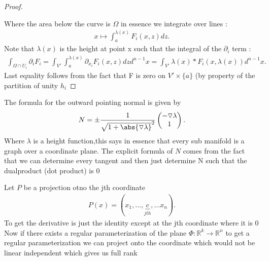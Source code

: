 \begin{proof}
\begin{figure}[H]
\begin{center}
 \end{center} 
 \end{figure}
 Where the area below the curve is $\Omega $ in essence we integrate over lines : 
 \begin{align*}
  x \mapsto \int_a^{\lambda(x)}  F_i(x,z) dz
 .\end{align*}
 Note that $\lambda(x)$ is the height at point x such that the integral of the $\partial_i$ term :
 \begin{align*}
   \int_{\Omega  \cap U_i} \partial_i F_i = \int_{V'} \int_a^{\lambda(x)}  \partial_{x_i} F_i(x,z) dz d^{n-1} x  = \int_{V'} \lambda(x)*F_i(x,\lambda(x)) d^{n-1}x
 .\end{align*}
 Last equality follows from the fact that F is zero on $V' \times  \{a\}  $ (by property of the partition of unity $h_i$ 
\end{proof}
\begin{definition}
  The formula for the outward pointing normal is given by 
  \begin{align*}
    N =  \pm \frac{1}{\sqrt{1+\abs{\triangledown \lambda}}^2 }\begin{pmatrix} -\triangledown \lambda  \\ 1 \end{pmatrix} 
  .\end{align*}
  Where $\lambda $ is a height function,this says in essence that every sub manifold is a graph over a coordinate plane. The explicit formula of $N$ comes from the fact 
  that we can determine every tangent and then just determine N such that the dualproduct (dot product) is 0 
\end{definition}
\begin{comment}
 The symbol $d\sigma$ in this case means that the integral is a surface integral and not a classical integral on a subset of $\mathbb{R}^{n } $.
\end{comment}
\begin{definition}[Projection ]
  Let $P$ be a projection otno the jth coordinate
  \begin{align*}
    P(x) = (x_{1},\ldots ,\underbrace{c}_{jth},\ldots x_n)
  .\end{align*}
  To get the derivative is just the identity except at the jth coordinate where it is 0  \\[1ex] 
  Now if there exists a regular parameterization of the plane $\Phi  : \mathbb{R}^{k} \to \mathbb{R}^{n}   $  to get a regular parameterization
  we can project onto the coordinate which would not be linear independent which gives us full rank
\end{definition}
